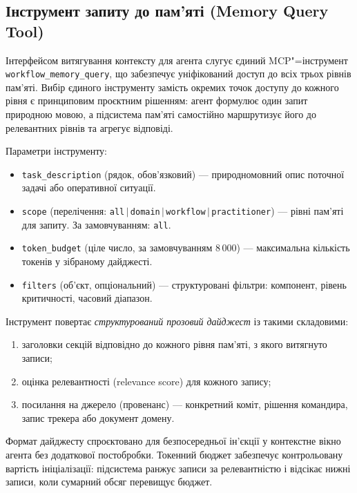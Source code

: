 
\subsection{Інструмент запиту до пам'яті (Memory Query Tool)}
\label{sec:memory-query-tool}

Інтерфейсом витягування контексту для агента слугує єдиний MCP"=інструмент \texttt{workflow\_memory\_query}, що забезпечує уніфікований доступ до всіх трьох рівнів пам'яті.
Вибір єдиного інструменту замість окремих точок доступу до кожного рівня є принциповим проєктним рішенням: агент формулює один запит природною мовою, а підсистема пам'яті самостійно маршрутизує його до релевантних рівнів та агрегує відповіді.

Параметри інструменту:
\begin{itemize}[leftmargin=*, nosep]
  \item \texttt{task\_description} (рядок, обов'язковий) --- природномовний опис поточної задачі або оперативної ситуації.
  \item \texttt{scope} (перелічення: \texttt{all}\,$|$\,\texttt{domain}\,$|$\,\texttt{workflow}\,$|$\,\texttt{practitioner}) --- рівні пам'яті для запиту. За замовчуванням: \texttt{all}.
  \item \texttt{token\_budget} (ціле число, за замовчуванням 8\,000) --- максимальна кількість токенів у зібраному дайджесті.
  \item \texttt{filters} (об'єкт, опціональний) --- структуровані фільтри: компонент, рівень критичності, часовий діапазон.
\end{itemize}

Інструмент повертає \emph{структурований прозовий дайджест} із такими складовими:
\begin{enumerate}[nosep]
  \item заголовки секцій відповідно до кожного рівня пам'яті, з якого витягнуто записи;
  \item оцінка релевантності (relevance score) для кожного запису;
  \item посилання на джерело (провенанс) --- конкретний коміт, рішення командира, запис трекера або документ домену.
\end{enumerate}

Формат дайджесту спроєктовано для безпосередньої ін'єкції у контекстне вікно агента без додаткової постобробки.
Токенний бюджет забезпечує контрольовану вартість ініціалізації: підсистема ранжує записи за релевантністю і відсікає нижні записи, коли сумарний обсяг перевищує бюджет.

